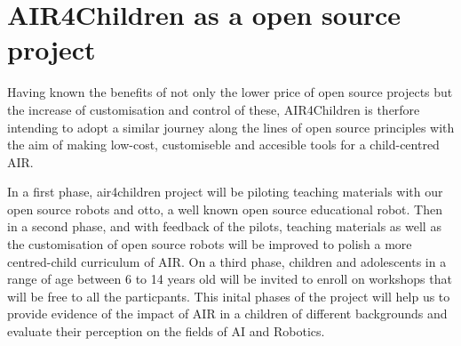 \documentclass[sigconf]{acmart}
\begin{document}
\section{AIR4Children as a open source project}
Having known the benefits of not only the lower price of open source projects but the increase of customisation and control of these, AIR4Children is therfore intending to adopt a similar journey along the lines of open source principles with the aim of making low-cost, customiseble and accesible tools for a child-centred AIR.

In a first phase, air4children project will be piloting teaching materials with our open source robots and otto, a well known open source educational robot.  
Then in a second phase, and with feedback of the pilots, teaching materials as well as the customisation of open source robots will be improved to polish a more centred-child curriculum of AIR. 
On a third phase, children and adolescents in a range of age between 6 to 14 years old will be invited to enroll on workshops that will be free to all the particpants. 
This inital phases of the project will help us to provide evidence of the impact of AIR in a children of different backgrounds and evaluate their perception on the fields of AI and Robotics.  




\end{document}
